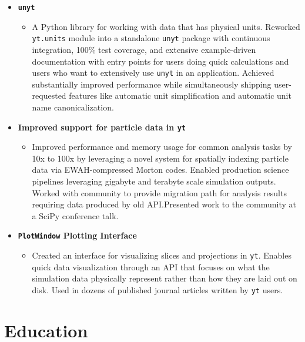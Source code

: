 \documentclass[10pt,letterpaper]{article}
\begin{document}
\begin{itemize}

  \item[] {\bf \texttt{unyt}}
    \begin{itemize}
      \item [] A Python library for working with data that has physical
        units. Reworked \texttt{yt.units} module into a standalone \texttt{unyt}
        package with continuous integration, 100\% test coverage, and extensive
        example-driven documentation with entry points for users doing quick
        calculations and users who want to extensively use \texttt{unyt} in an
        application. Achieved substantially improved performance while
        simultaneously shipping user-requested features like automatic unit
        simplification and automatic unit name canonicalization.
    \end{itemize}
  \item[] {\bf Improved support for particle data in \texttt{yt}}
    \begin{itemize}
      \item [] Improved performance and memory usage for common analysis tasks by
        10x to 100x by leveraging a novel system for spatially indexing particle
        data via EWAH-compressed Morton codes. Enabled production science
        pipelines leveraging gigabyte and terabyte scale simulation
        outputs. Worked with community to provide migration path for analysis
        results requiring data produced by old API.\@ Presented work to the
        community at a SciPy conference talk.
    \end{itemize}
  \item[] {\bf\texttt{PlotWindow} Plotting Interface}
    \begin{itemize}
      \item [] Created an interface for visualizing slices and projections in
        \texttt{yt}. Enables quick data visualization through an API that
        focuses on what the simulation data physically represent rather than how
        they are laid out on disk. Used in dozens of published journal articles
        written by \texttt{yt} users.
    \end{itemize}

\end{itemize}


\section*{Education}
\end{document}
